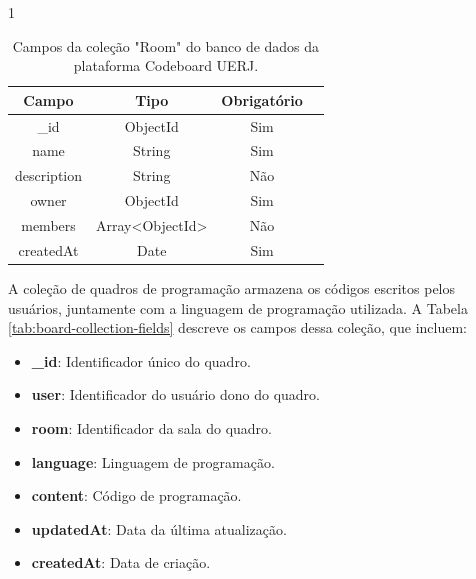 \begin{table}[H]{1\textwidth}
    \centering
    \caption{Campos da coleção "Room" do banco de dados da plataforma Codeboard UERJ.}
    \label{tab:room-collection-fields}
    \renewcommand{\arraystretch}{1.3} 
    \begin{tabular}{|c|c|c|c|}
        \hline
        \textbf{Campo}              & \textbf{Tipo}   & \textbf{Obrigatório} \\
        \hline
        \_id              & ObjectId        & Sim                  \\
        \hline
        name                          & String          & Sim                  \\
        \hline
        description               & String          & Não                  \\
        \hline
        owner          & ObjectId        & Sim                  \\
        \hline
        members        & Array<ObjectId> & Não                  \\
        \hline
        createdAt           & Date            & Sim                  \\
        \hline
    \end{tabular}
\end{table}


A coleção de quadros de programação armazena os códigos escritos pelos usuários, juntamente com a linguagem de programação utilizada. A Tabela \ref{tab:board-collection-fields} descreve os campos dessa coleção, que incluem:

\begin{itemize}
    \item \textbf{\_id}: Identificador único do quadro.
    \item \textbf{user}: Identificador do usuário dono do quadro.
    \item \textbf{room}: Identificador da sala do quadro.
    \item \textbf{language}: Linguagem de programação.
    \item \textbf{content}: Código de programação.
    \item \textbf{updatedAt}: Data da última atualização.
    \item \textbf{createdAt}: Data de criação.
\end{itemize}

